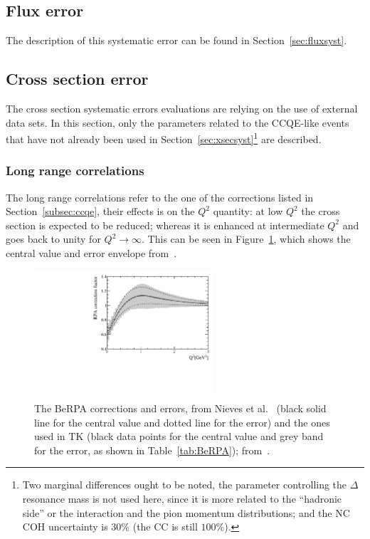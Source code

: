 \subsection{Flux error}
\label{subsec:fluxsyst}
The description of this systematic error can be found in
Section~\ref{sec:fluxsyst}.

\subsection{Cross section error}
\label{subsec:xsecsystccqe}
The cross section systematic errors evaluations are relying on the use
of external data sets. In this section, only the parameters related to
the \Gls{CCQE}-like events that have not already been used in
Section~\ref{sec:xsecsyst}\footnote{Two marginal differences ought to
  be noted, the parameter controlling the $\Delta$ resonance mass is
  not used here, since it is more related to the ``hadronic side'' or
  the interaction and the pion momentum distributions; and the
  \Gls{NC} \Gls{COH} uncertainty is $30\%$ (the \Gls{CC} is still
  $100\%$).} are described.


\subsubsection{Long range correlations}
\label{subsubsec:lrc}
The long range correlations refer to the one of the corrections listed
in Section~\ref{subsec:ccqe}, their effects is on the $Q^2$ quantity:
at low $Q^2$ the cross section is expected to be reduced; whereas it
is enhanced at intermediate $Q^2$ and goes back to unity for
$Q^2\rightarrow \infty $. This can be seen in Figure~\ref{fig:BeRPA},
which shows the central value and error envelope
from~\cite{NievesCCinc}.

\begin{figure}[ht]
  \center
  \includegraphics[width=0.6\textwidth]{images/BANFF/erpa_20percent_combined_throws}
  \caption[BeRPA corrections and errors]{The \Gls{BeRPA}
    corrections and errors, from Nieves et al.~\cite{NievesCCinc}
    (black solid line for the central value and dotted line for the
    error) and the ones used in \Gls{TK} (black data points for the
    central value and grey band for the error, as shown in
    Table~\ref{tab:BeRPA}); from~\cite{TN315}.}
  \label{fig:BeRPA}
\end{figure}

